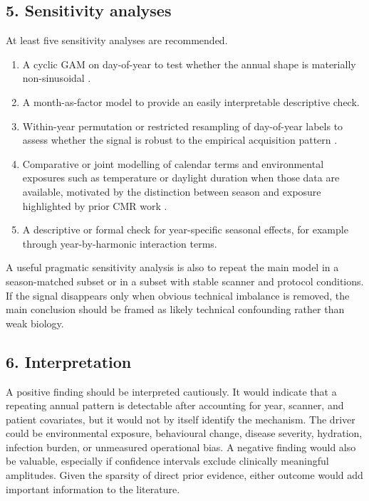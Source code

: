 \subsection*{5. Sensitivity analyses}

At least five sensitivity analyses are recommended.
\begin{enumerate}
  \item A cyclic GAM on day-of-year to test whether the annual shape is materially non-sinusoidal \cite{Wood2017}.
  \item A month-as-factor model to provide an easily interpretable descriptive check.
  \item Within-year permutation or restricted resampling of day-of-year labels to assess whether the signal is robust to the empirical acquisition pattern \cite{Efron1994}.
  \item Comparative or joint modelling of calendar terms and environmental exposures such as temperature or daylight duration when those data are available, motivated by the distinction between season and exposure highlighted by prior CMR work \cite{Park2019,Redfors2022}.
  \item A descriptive or formal check for year-specific seasonal effects, for example through year-by-harmonic interaction terms.
\end{enumerate}

A useful pragmatic sensitivity analysis is also to repeat the main model in a season-matched subset or in a subset with stable scanner and protocol conditions. If the signal disappears only when obvious technical imbalance is removed, the main conclusion should be framed as likely technical confounding rather than weak biology.

\subsection*{6. Interpretation}

A positive finding should be interpreted cautiously. It would indicate that a repeating annual pattern is detectable after accounting for year, scanner, and patient covariates, but it would not by itself identify the mechanism. The driver could be environmental exposure, behavioural change, disease severity, hydration, infection burden, or unmeasured operational bias. A negative finding would also be valuable, especially if confidence intervals exclude clinically meaningful amplitudes. Given the sparsity of direct prior evidence, either outcome would add important information to the literature.
